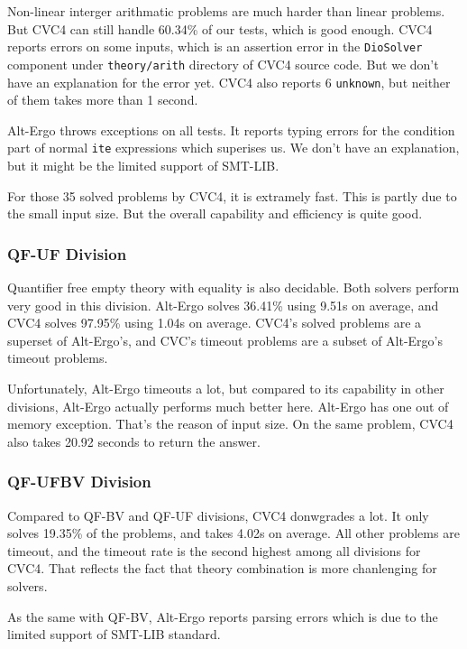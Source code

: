 \documentclass[10pt,letter]{article}
\theoremstyle{definition}
\begin{document}
Non-linear interger arithmatic problems are much harder than linear problems. But CVC4 can still handle 60.34\% of our tests, which is good enough. CVC4 reports errors on some inputs, which is an assertion error in the {\tt DioSolver} component under {\tt theory/arith} directory of CVC4 source code. But we don't have an explanation for the error yet. CVC4 also reports 6 {\tt unknown}, but neither of them takes more than 1 second.

Alt-Ergo throws exceptions on all tests. It reports typing errors for the condition part of normal {\tt ite} expressions which superises us. We don't have an explanation, but it might be the limited support of SMT-LIB.

For those 35 solved problems by CVC4, it is extramely fast. This is partly due to the small input size. But the overall capability and efficiency is quite good.

\subsubsection{QF-UF Division}

Quantifier free empty theory with equality is also decidable. Both solvers perform very good in this division. Alt-Ergo solves 36.41\% using 9.51s on average, and CVC4 solves 97.95\% using 1.04s on average. CVC4's solved problems are a superset of Alt-Ergo's, and CVC's timeout problems are a subset of Alt-Ergo's timeout problems. 

Unfortunately, Alt-Ergo timeouts a lot, but compared to its capability in other divisions, Alt-Ergo actually performs much better here. Alt-Ergo has one out of memory exception. That's the reason of input size. On the same problem, CVC4 also takes 20.92 seconds to return the answer.

\subsubsection{QF-UFBV Division}

Compared to QF-BV and QF-UF divisions, CVC4 donwgrades a lot. It only solves 19.35\% of the problems, and takes 4.02s on average. All other problems are timeout, and the timeout rate is the second highest among all divisions for CVC4. That reflects the fact that theory combination is more chanlenging for solvers.

As the same with QF-BV, Alt-Ergo reports parsing errors which is due to the limited support of SMT-LIB standard.
\end{document}
